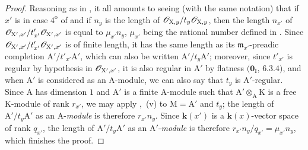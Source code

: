 \begin{proof}
Reasoning as in , it all amounts to seeing (with the same notation) that if $x'$ is in case $4^{\mathrm{o}}$ of  and if $n_y$ is the length of $\mathscr{O}_{\mathrm{X},y}/t_y\mathscr{O}_{\mathrm{X},y}$, then the
length $n_{x'}$ of $\mathscr{O}_{\mathrm{X}',x'}/t'_{x'}\mathscr{O}_{\mathrm{X}',x'}$ is equal to $\mu_{x'}n_y$, $\mu_{x'}$ being the rational number defined in .
Since $\mathscr{O}_{\mathrm{X}',x'}/t'_{x'}\mathscr{O}_{\mathrm{X}',x'}$ is of finite length, it has the same length as its $\mathfrak{m}_{x'}$-preadic completion $\mathrm{A}'/t'_{x'}\mathrm{A}'$, which can also be written $\mathrm{A}'/t_y\mathrm{A}'$; moreover, since $t'_{x'}$ is regular by hypothesis in $\mathscr{O}_{\mathrm{X}',x'}$, it is also regular in $\mathrm{A}'$ by flatness $(\mathbf{0}_{\mathrm{I}}$, $6.3.4)$, and when $\mathrm{A}'$ is considered as an A-module, we can also say that $t_y$ is $\mathrm{A}'$-regular.
Since $\mathrm{A}$ has dimension $1$ and $\mathrm{A}'$ is a finite $\mathrm{A}$-module such that $\mathrm{A}'\otimes_{\mathrm{A}}\mathrm{K}$ is a free $\mathrm{K}$-module of rank $r_{x'}$, we may apply ,{}~(v) to $\mathrm{M}=\mathrm{A}'$ and $t_y$; the length of $\mathrm{A}'/t_y\mathrm{A}'$ as an $\mathrm{A}$-\emph{module} is therefore $r_{x'}n_y$.
Since $\boldsymbol{k}(x')$ is a $\boldsymbol{k}(x)$-vector space of rank $q_{x'}$, the length of $\mathrm{A}'/t_y\mathrm{A}'$ as an $\mathrm{A}'$-\emph{module} is therefore $r_{x'}n_y/q_{x'}=\mu_{x'}n_y$, which finishes the proof.
\end{proof}

